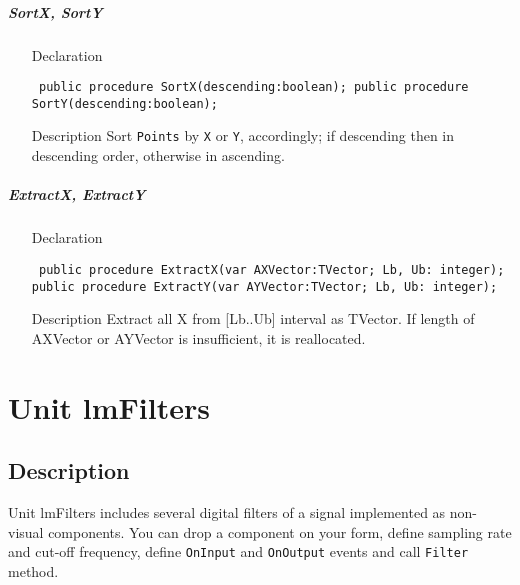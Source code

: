 \documentclass[12pt,a4paper,oneside]{report}
\newcommand{\declarationitem}[1]{{\addfontfeatures{FakeBold=1.3} #1}}
\newcommand{\descriptiontitle}[1]{{\addfontfeatures{FakeSlant}#1}}
\newcommand{\code}[1]{\texttt{#1}}
\begin{document}
\paragraph{SortX, SortY}\hspace*{\fill}
\label{lmPointsVec.TPoints-SortX}
\begin{itemize}\item[\declarationitem{Declaration}\hfill]
	\begin{flushleft}
		\code{
			public procedure SortX(descending:boolean);
			public procedure SortY(descending:boolean);}
	\end{flushleft}
	
	\par
	\item[\descriptiontitle{Description}]
	Sort \code{Points} by \code{X} or \code{Y}, accordingly; if descending then in descending order, otherwise in ascending.
\end{itemize}
\paragraph{ExtractX, ExtractY}\hspace*{\fill}

\label{lmPointsVec.TPoints-ExtractX}
\begin{itemize}\item[\declarationitem{Declaration}\hfill]
	\begin{flushleft}
		\code{
			public procedure ExtractX(var AXVector:TVector; Lb, Ub: integer);
			public procedure ExtractY(var AYVector:TVector; Lb, Ub: integer);}
	\end{flushleft}

	\item[\descriptiontitle{Description}]
	Extract all X from [Lb..Ub] interval as TVector. If length of AXVector or AYVector is insufficient, it is reallocated. 
\end{itemize}
\chapter{Unit lmFilters}
\label{lmfilters}
\section{Description}
Unit lmFilters includes several digital filters of a signal implemented as non-visual components. You can drop a component on your form, define sampling rate and cut-off frequency, define \code{OnInput} and \code{OnOutput} events and call \code{Filter} method.
\end{document}
